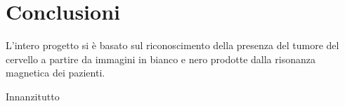 \chapter{Conclusioni}

L'intero progetto si è basato sul riconoscimento della presenza del tumore del 
cervello a partire da immagini in bianco e nero prodotte dalla risonanza magnetica
dei pazienti.

Innanzitutto 